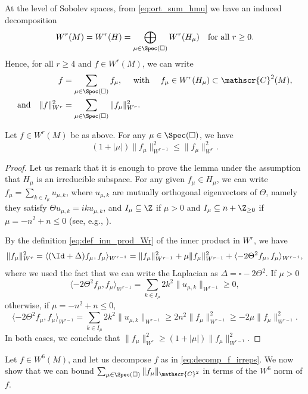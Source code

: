 At the level of Sobolev spaces, from \eqref{eq:ort_sum_hmu} we have an induced decomposition
\[
W^r(M) = W^r(H) = \bigoplus_{\mu \in \Spec(\square)} W^r(H_{\mu}) \quad \text{for all $r \geq 0$}.
\]
Hence, for all $r \geq 4$ and $f \in W^r(M)$, we can write
\begin{equation}\label{eq:decomp_f_irreps}
\begin{split}
f &= \sum_{\mu \in \Spec(\square)} f_\mu, \quad \text{ with } \quad f_\mu \in W^r(H_{\mu}) \subset \mathscr{C}^2(M), \\
\text{and} \quad \|f\|^2_{W^r} &= \sum_{\mu \in \Spec(\square)} \|f_\mu\|^2_{W^r}.
\end{split}
\end{equation}

\begin{lemma}\label{lemma:w4_to_w6}
Let $f \in W^r(M)$ be as above. For any $\mu \in \Spec(\square)$, we have
\[
(1+|\mu|) \|f_\mu\|^2_{W^{r-1}} \leq \|f_\mu\|^2_{W^r}.
\]
\end{lemma}
\begin{proof}
Let us remark that it is enough to prove the lemma under the assumption that $H_\mu$ is an irreducible subspace.
For any given $f_\mu \in H_\mu$, we can write $f_\mu = \sum_{k \in I_\mu} u_{\mu, k}$, where $u_{\mu, k}$ are mutually orthogonal eigenvectors of $\Theta$, namely they satisfy $\Theta u_{\mu, k} = iku_{\mu, k}$, and $I_\mu \subseteq \Z$ if $\mu >0$ and $I_\mu \subseteq n+ \Z_{\geq 0}$ if $\mu = -n^2+n \leq 0$ (see, e.g., \cite[\S2]{FlaFo}).

By the definition \eqref{eq:def_inn_prod_Wr} of the inner product in $W^r$, we have
\[
\|f_\mu\|^2_{W^r} = \langle (\Id+\Delta) f_\mu, f_\mu \rangle_{W^{r-1}} = \|f_\mu\|^2_{W^{r-1}} + \mu \|f_\mu\|^2_{W^{r-1}} + \langle -2\Theta^2 f_\mu, f_\mu \rangle_{W^{r-1}},
\]
where we used the fact that we can write the Laplacian as $\Delta = \square - 2 \Theta^2$.
If $\mu >0$
\[
\langle -2\Theta^2 f_\mu, f_\mu \rangle_{W^{r-1}} = \sum_{k \in I_\mu} 2k^2 \|u_{\mu, k}\|_{W^{r-1}} \geq 0,
\]
otherwise, if $\mu = -n^2+n \leq 0$,
\[
\langle -2\Theta^2 f_\mu, f_\mu \rangle_{W^{r-1}} = \sum_{k \in I_\mu} 2k^2 \|u_{\mu, k}\|_{W^{r-1}} \geq 2n^2 \|f_\mu\|^2_{W^{r-1}}\geq -2\mu \|f_\mu\|^2_{W^{r-1}}.
\]
In both cases, we conclude that $\|f_\mu\|^2_{W^r} \geq (1+|\mu|)\|f_\mu\|^2_{W^{r-1}}$.
\end{proof}

Let $f \in W^6(M)$, and let us decompose $f$ as in \eqref{eq:decomp_f_irreps}. We now show that we can bound $\sum_{\mu \in \Spec(\square)} \|f_\mu\|_{\mathscr{C}^2}$ in terms of the $W^6$ norm of $f$.

